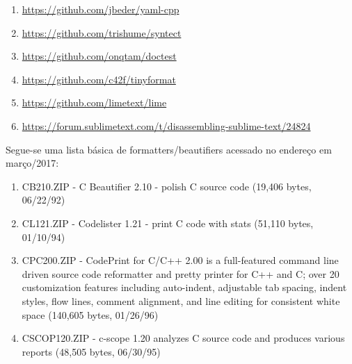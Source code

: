 \begin{englishtext}
    \begin{bluebox}
    \begin{enumerate}[leftmargin=*,parsep=0pt]

        \item \url{https://github.com/jbeder/yaml-cpp}
        \item \url{https://github.com/trishume/syntect}
        \item \url{https://github.com/onqtam/doctest}
        \item \url{https://github.com/c42f/tinyformat}
        \item \url{https://github.com/limetext/lime}
        \item \url{https://forum.sublimetext.com/t/disassembling-sublime-text/24824}

    \end{enumerate}
    \end{bluebox}

    Segue-se uma lista básica de formatters/beautifiers acessado no endereço
     em março/2017:

    \medskip
    \begin{sloppypar}
    \begin{bluebox}\RaggedRight
    \begin{enumerate}[leftmargin=*,parsep=0pt]

        \item CB210.ZIP - C Beautifier 2.10 - polish C source code (19,406 bytes, 06/22/92)
        \item CL121.ZIP - Codelister 1.21 - print C code with stats (51,110 bytes, 01/10/94)

        \item CPC200.ZIP - CodePrint for C/C++ 2.00 is a full-featured command line driven source
        code reformatter and pretty printer for C++ and C; over 20 customization features including
        auto-indent, adjustable tab spacing, indent styles, flow lines, comment alignment, and line
        editing for consistent white space (140,605 bytes, 01/26/96)

        \item CSCOP120.ZIP - c-scope 1.20 analyzes C source code and produces various reports
        (48,505 bytes, 06/30/95)


\end{enumerate}
\end{bluebox}
\end{sloppypar}
\end{englishtext}
